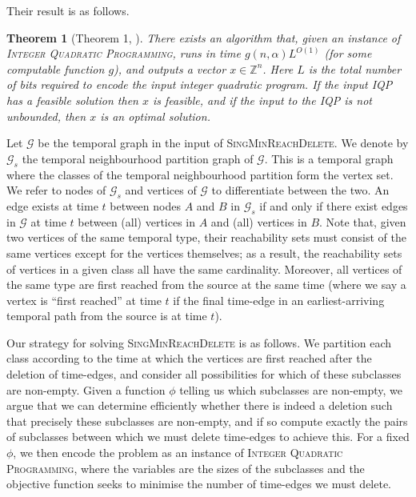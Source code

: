 \documentclass[preprint,12pt]{elsarticle}
\newtheorem{theorem}{Theorem}
\begin{document}
Their result is as follows.
\begin{theorem}[Theorem 1, \cite{lokshtanov_parameterized_2017}]\label{thm:iqp-ref}
    There exists an algorithm that, given an instance of \textsc{Integer Quadratic Programming}, runs in time $g(n,\alpha)L^{O(1)}$ (for some computable function $g$), and outputs a vector $x\in\mathbb{Z}^n$. Here $L$ is the total number of bits required to encode the input integer quadratic program. If the input IQP has a feasible solution then $x$ is feasible, and if the input to the IQP is not unbounded, then $x$ is an optimal solution.
\end{theorem}

Let $\mathcal{G}$ be the temporal graph in the input of \textsc{SingMinReachDelete}. We denote by $\mathcal{G}_s$ the temporal neighbourhood partition graph of $\mathcal{G}$. This is a temporal graph where the classes of the temporal neighbourhood partition form the vertex set. We refer to nodes of $\mathcal{G}_s$ and vertices of $\mathcal{G}$ to differentiate between the two. An edge exists at time $t$ between nodes $A$ and $B$ in $\mathcal{G}_s$ if and only if there exist edges in $\mathcal{G}$ at time $t$ between (all) vertices in $A$ and (all) vertices in $B$. Note that, given two vertices of the same temporal type, their reachability sets must consist of the same vertices except for the vertices themselves; as a result, the reachability sets of vertices in a given class all have the same cardinality.  Moreover, all vertices of the same type are first reached from the source at the same time (where we say a vertex is ``first reached'' at time $t$ if the final time-edge in an earliest-arriving temporal path from the source is at time $t$).  

Our strategy for solving \textsc{SingMinReachDelete} is as follows.  We partition each class according to the time at which the vertices are first reached after the deletion of time-edges, and consider all possibilities for which of these subclasses are non-empty.  Given a function $\phi$ telling us which subclasses are non-empty, we argue that we can determine efficiently whether there is indeed a deletion such that precisely these subclasses are non-empty, and if so compute exactly the pairs of subclasses between which we must delete time-edges to achieve this.  For a fixed $\phi$, we then encode the problem as an instance of \textsc{Integer Quadratic Programming}, where the variables are the sizes of the subclasses and the objective function seeks to minimise the number of time-edges we must delete.
\end{document}

